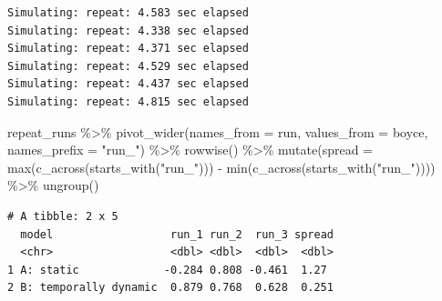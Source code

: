 \documentclass[
  letterpaper,
  DIV=11,
  numbers=noendperiod]{scrartcl}
\newenvironment{Shaded}{\begin{snugshade}}{\end{snugshade}}
\newcommand{\AttributeTok}[1]{\textcolor[rgb]{0.40,0.45,0.13}{#1}}
\newcommand{\FunctionTok}[1]{\textcolor[rgb]{0.28,0.35,0.67}{#1}}
\newcommand{\NormalTok}[1]{\textcolor[rgb]{0.00,0.23,0.31}{#1}}
\newcommand{\SpecialCharTok}[1]{\textcolor[rgb]{0.37,0.37,0.37}{#1}}
\newcommand{\StringTok}[1]{\textcolor[rgb]{0.13,0.47,0.30}{#1}}
\begin{document}
\begin{verbatim}
Simulating: repeat: 4.583 sec elapsed
Simulating: repeat: 4.338 sec elapsed
Simulating: repeat: 4.371 sec elapsed
Simulating: repeat: 4.529 sec elapsed
Simulating: repeat: 4.437 sec elapsed
Simulating: repeat: 4.815 sec elapsed
\end{verbatim}

\begin{Shaded}
\begin{Highlighting}[]
\NormalTok{repeat\_runs }\SpecialCharTok{\%\textgreater{}\%}
  \FunctionTok{pivot\_wider}\NormalTok{(}\AttributeTok{names\_from =}\NormalTok{ run, }\AttributeTok{values\_from =}\NormalTok{ boyce, }\AttributeTok{names\_prefix =} \StringTok{"run\_"}\NormalTok{) }\SpecialCharTok{\%\textgreater{}\%}
  \FunctionTok{rowwise}\NormalTok{() }\SpecialCharTok{\%\textgreater{}\%}
  \FunctionTok{mutate}\NormalTok{(}\AttributeTok{spread =} \FunctionTok{max}\NormalTok{(}\FunctionTok{c\_across}\NormalTok{(}\FunctionTok{starts\_with}\NormalTok{(}\StringTok{"run\_"}\NormalTok{))) }\SpecialCharTok{{-}}
                  \FunctionTok{min}\NormalTok{(}\FunctionTok{c\_across}\NormalTok{(}\FunctionTok{starts\_with}\NormalTok{(}\StringTok{"run\_"}\NormalTok{)))) }\SpecialCharTok{\%\textgreater{}\%}
  \FunctionTok{ungroup}\NormalTok{()}
\end{Highlighting}
\end{Shaded}

\begin{verbatim}
# A tibble: 2 x 5
  model                  run_1 run_2  run_3 spread
  <chr>                  <dbl> <dbl>  <dbl>  <dbl>
1 A: static             -0.284 0.808 -0.461  1.27 
2 B: temporally dynamic  0.879 0.768  0.628  0.251
\end{verbatim}
\end{document}
